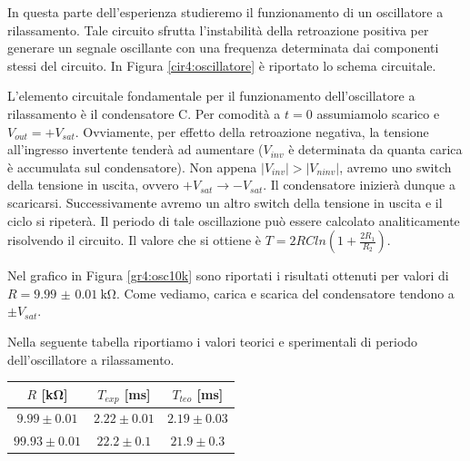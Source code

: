 In questa parte dell'esperienza studieremo il funzionamento di un oscillatore a rilassamento. Tale circuito sfrutta l'instabilità della retroazione positiva per generare un segnale oscillante con una frequenza determinata dai componenti stessi del circuito. In Figura \ref{cir4:oscillatore} è riportato lo schema circuitale. 

L'elemento circuitale fondamentale per il funzionamento dell'oscillatore a rilassamento è il condensatore C. Per comodità a $t=0$ assumiamolo scarico e $V_{out}=+V_{sat}$. Ovviamente, per effetto della retroazione negativa, la tensione all'ingresso invertente tenderà ad aumentare ($V_{inv}$ è determinata da quanta carica è accumulata sul condensatore). Non appena $|V_{inv}|>|V_{ninv}|$, avremo uno switch della tensione in uscita, ovvero $+V_{sat} \rightarrow -V_{sat}$. Il condensatore inizierà dunque a scaricarsi. Successivamente avremo un altro switch della tensione in uscita e il ciclo si ripeterà. Il periodo di tale oscillazione può essere calcolato analiticamente risolvendo il circuito. Il valore che si ottiene è $T=2RCln(1+\frac{2R_1}{R_2})$.  

Nel grafico in Figura \ref{gr4:osc10k} sono riportati i risultati ottenuti per valori di $R=\SI{9.99(1)}{\kohm}$. Come vediamo, carica e scarica del condensatore tendono a $\pm V_{sat}$.

Nella seguente tabella riportiamo i valori teorici e sperimentali di periodo dell'oscillatore a rilassamento.

\begin{center}
{\renewcommand{\arraystretch}{1.2}%
	\begin{tabular}{c|c|c}
	$R$ [\si{\kilo\ohm}] & $T_{exp}$ [\si{\milli\second}] & $T_{teo}$ [\si{\milli\second}]\\
    \hline
	$9.99\pm0.01 $ & $2.22\pm0.01$ & $2.19 \pm 0.03$\\
    \hline
	$99.93\pm0.01 $ & $22.2\pm0.1$ & $21.9 \pm 0.3$\\
	\end{tabular}
}
\end{center}

